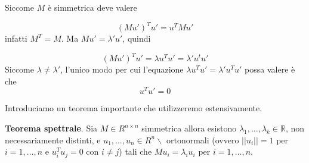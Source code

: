 \documentclass[12pt]{report}
\begin{document}
\begin{dimo}
    Siccome $M$ è simmetrica deve valere

    $$(Mu')^T u' = u^T M u'$$
    infatti $M^T = M$. Ma $M u' =  \lambda' u'$, quindi

    $$(Mu')^T u' =  \lambda u^T  u' = \lambda' u^t u'$$
    Siccome $\lambda \neq \lambda'$, l'unico modo per cui l'equazione $\lambda u^T  u' = \lambda' u^T u'$ possa valere è che 
    $$u^Tu' = 0$$
\end{dimo}
\noindent
Introduciamo un teorema importante che utilizzeremo estensivamente.

\begin{teo}
    \textbf{Teorema spettrale}. Sia $M \in R^{n \times n}$ simmetrica allora esistono $\lambda_1,\dots,\lambda_k \in \mathbb{R}$, non necessariamente distinti, e $u_1,\dots,u_n \in R^n \backslash$ ortonormali (ovvero $||u_i|| = 1$ per $i =1,\dots,n$ e $u_i^T u_j = 0 $ con $i \neq j$) tali che $Mu_i = \lambda_i u_i $ per $i = 1,\dots,n$.
\end{teo}
\end{document}
